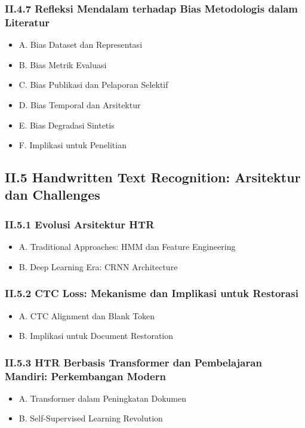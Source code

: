 \documentclass[11pt,a4paper]{article}
\begin{document}
\subsubsection*{II.4.7 Refleksi Mendalam terhadap Bias Metodologis dalam Literatur}
\begin{itemize}[label={}, leftmargin=2em]
    \item A. Bias Dataset dan Representasi
    \item B. Bias Metrik Evaluasi
    \item C. Bias Publikasi dan Pelaporan Selektif
    \item D. Bias Temporal dan Arsitektur
    \item E. Bias Degradasi Sintetis
    \item F. Implikasi untuk Penelitian
\end{itemize}

\vspace{0.5em}

\subsection*{II.5 Handwritten Text Recognition: Arsitektur dan Challenges}

\subsubsection*{II.5.1 Evolusi Arsitektur HTR}
\begin{itemize}[label={}, leftmargin=2em]
    \item A. Traditional Approaches: HMM dan Feature Engineering
    \item B. Deep Learning Era: CRNN Architecture
\end{itemize}

\subsubsection*{II.5.2 CTC Loss: Mekanisme dan Implikasi untuk Restorasi}
\begin{itemize}[label={}, leftmargin=2em]
    \item A. CTC Alignment dan Blank Token
    \item B. Implikasi untuk Document Restoration
\end{itemize}

\subsubsection*{II.5.3 HTR Berbasis Transformer dan Pembelajaran Mandiri: Perkembangan Modern}
\begin{itemize}[label={}, leftmargin=2em]
    \item A. Transformer dalam Peningkatan Dokumen
    \item B. Self-Supervised Learning Revolution
\end{itemize}
\end{document}
